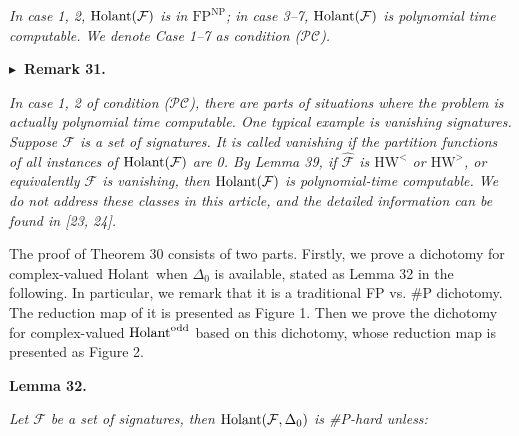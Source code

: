 \emph{In case 1, 2, $\textup{{Holant}}(\mathcal{F})$ is in $\text{FP}^{\text{NP}}$; in case 3–7, $\textup{{Holant}}(\mathcal{F})$ is polynomial time computable. We denote Case 1–7 as condition ($\mathcal{PC}$).}\par







\par\medskip\noindent\textbf{
$\blacktriangleright$ Remark 31.
}\par



\emph{In case 1, 2 of condition ($\mathcal{PC}$), there are parts of situations where the problem is actually polynomial time computable. One typical example is vanishing signatures. Suppose $\mathcal{F}$ is a set of signatures. It is called vanishing if the partition functions of all instances of $\textup{{Holant}}(\mathcal{F})$ are 0. By Lemma 39, if $\widehat{\mathcal{F}}$ is $\text{HW}^{<}$ or $\text{HW}^{>}$, or equivalently $\mathcal{F}$ is vanishing, then $\textup{{Holant}}(\mathcal{F})$ is polynomial-time computable. We do not address these classes in this article, and the detailed information can be found in [23, 24].}\par






The proof of Theorem 30 consists of two parts. Firstly, we prove a dichotomy for complex-valued Holant when $\Delta_{0}$ is available, stated as Lemma 32 in the following. In particular, we remark that it is a traditional FP vs. \#P dichotomy. The reduction map of it is presented as Figure 1. Then we prove the dichotomy for complex-valued $\textup{{Holant}}^{\text{odd}}$ based on this dichotomy, whose reduction map is presented as Figure 2.\par





\par\medskip\noindent\textbf{
\textbf{Lemma 32}\textbf{.}
}\par



\emph{Let $\mathcal{F}$ be a set of signatures, then $\textup{{Holant}}(\mathcal{F},\Delta_{0})$ is \#P-hard unless:}\par


